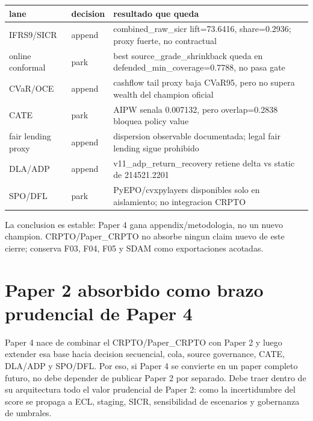 \documentclass[
  spanish,
  11pt,
  letterpaper,
]{scrbook}
\newcounter{none} %
\theoremstyle{plain}
\theoremstyle{remark}
\begin{document}
{\def\LTcaptype{none} %
\begin{longtable}[]{@{}
  >{\raggedright\arraybackslash}p{}
  >{\raggedright\arraybackslash}p{}
  >{\raggedright\arraybackslash}p{}@{}}
\toprule\noalign{}
\begin{minipage}[b]{\linewidth}\raggedright
lane
\end{minipage} & \begin{minipage}[b]{\linewidth}\raggedright
decision
\end{minipage} & \begin{minipage}[b]{\linewidth}\raggedright
resultado que queda
\end{minipage} \\
\midrule\noalign{}
\endhead
\bottomrule\noalign{}
\endlastfoot
IFRS9/SICR & append & combined\_raw\_sicr lift=73.6416, share=0.2936;
proxy fuerte, no contractual \\
online conformal & park & best source\_grade\_shrinkback queda en
defended\_min\_coverage=0.7788, no pasa gate \\
CVaR/OCE & append & cashflow tail proxy baja CVaR95, pero no supera
wealth del champion oficial \\
CATE & park & AIPW senala 0.007132, pero overlap=0.2838 bloquea policy
value \\
fair lending proxy & append & dispersion observable documentada; legal
fair lending sigue prohibido \\
DLA/ADP & append & v11\_adp\_return\_recovery retiene delta vs static de
214521.2201 \\
SPO/DFL & park & PyEPO/cvxpylayers disponibles solo en aislamiento; no
integracion CRPTO \\
\end{longtable}
}

La conclusion es estable: Paper 4 gana appendix/metodologia, no un nuevo
champion. CRPTO/Paper\_CRPTO no absorbe ningun claim nuevo de este
cierre; conserva F03, F04, F05 y SDAM como exportaciones acotadas.

\section{Paper 2 absorbido como brazo prudencial de Paper
4}\label{paper-2-absorbido-como-brazo-prudencial-de-paper-4}

Paper 4 nace de combinar el CRPTO/Paper\_CRPTO con Paper 2 y luego
extender esa base hacia decision secuencial, cola, source governance,
CATE, DLA/ADP y SPO/DFL. Por eso, si Paper 4 se convierte en un paper
completo futuro, no debe depender de publicar Paper 2 por separado. Debe
traer dentro de su arquitectura todo el valor prudencial de Paper 2:
como la incertidumbre del score se propaga a ECL, staging, SICR,
sensibilidad de escenarios y gobernanza de umbrales.
\end{document}
